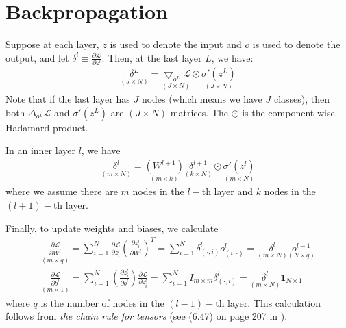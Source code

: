 \documentclass[letterpaper,12pt]{article}
\begin{document}
\section{Backpropagation}
Suppose at each layer, $z$ is used to denote the input and $o$ is used to denote the output, and let $\delta^l\equiv\frac{\partial \mathcal{L}}{\partial z^l}$. Then, at the last layer $L$, we have:
\begin{align}
\underset{(J\times N)}{\delta^L} =\underset{(J\times N)}{ \bigtriangledown_{o^L}\mathcal{L}}\odot \underset{(J\times N)}{\sigma'(z^L)}
\end{align}
Note that if the last layer has $J$ nodes (which means we have $J$ classes), then both $\Delta_{o^L}\mathcal{L}$ and $\sigma'(z^L)$ are $(J\times N)$ matrices. The $\odot$ is the component wise Hadamard product.

In an inner layer $l$, we have
\begin{align}
\underset{(m\times N)}{\delta^l } = \underset{(m\times k)}{\left(W^{l+1}\right)} \underset{(k\times N)}{\delta^{l+1}}  \odot \underset{(m\times N)}{\sigma'(z^l)}
\end{align}
where we assume there are $m$ nodes in the $l-$th layer and $k$ nodes in the $(l+1)-$th layer.

Finally, to update weights and biases, we calculate
\begin{align}
 \underset{(m\times q)}{\frac{\partial \mathcal{L}}{\partial W^l}} =  \sum_{i=1}^{N} \frac{\partial \mathcal{L}}{\partial z^l_i} \left(\frac{\partial z_i^l}{\partial W^l}\right)^T= \sum_{i=1}^{N} \delta^l_{(\cdot , i)} o^l_{(i,\cdot)} = \underset{(m\times N)}{\delta^l } \underset{(N\times q)}{o^{l-1}}\\
 \underset{(m\times 1)}{\frac{\partial \mathcal{L}}{\partial b^l}} = \sum_{i=1}^{N} \left(\frac{\partial z_i^l}{\partial b^l}\right)\frac{\partial \mathcal{L}}{\partial z^l_i} =  \sum_{i=1}^{N} I_{m\times m}\delta^l_{(\cdot , i)}= \underset{(m\times N)}{\delta^l }\boldsymbol{1}_{N\times 1}
\end{align}
where $q$ is the number of nodes in the $(l-1)-$th layer. This calculation follows from \textit{the chain rule for tensors} (see (6.47) on page 207 in \cite{goodfellow2016deep}).
\end{document}

